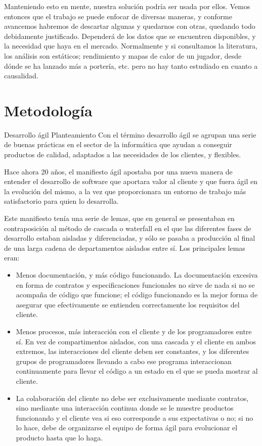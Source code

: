 Manteniendo esto en mente, nuestra solución 
podría ser usada por ellos. Vemos entonces 
que el trabajo se puede enfocar de diversas 
maneras, y conforme avancemos habremos de descartar algunas y 
quedarnos con otras, quedando todo debidamente justificado. Dependerá de los 
datos que se encuentren disponibles, y la necesidad que haya en el mercado. 
Normalmente y si consultamos la literatura, los análisis son estáticos; 
rendimiento y mapas de calor de un jugador, desde dónde se ha lanzado más 
a portería, etc. pero no hay tanto estudiado en cuanto a causalidad.

\section{Metodología}

Desarrollo ágil
Planteamiento
Con el término desarrollo ágil se agrupan una serie de buenas prácticas en 
el sector de la informática que ayudan a conseguir productos de calidad, 
adaptados a las necesidades de los clientes, y flexibles. 

Hace ahora 20 años, el manifiesto ágil apostaba por una nueva manera de 
entender el desarrollo de software que aportara valor al cliente y que fuera 
ágil en la evolución del mismo, a la vez que proporcionara un entorno de 
trabajo más satisfactorio para quien lo desarrolla.

Este manifiesto tenía una serie de lemas, que en general se presentaban en 
contraposición al método de cascada o waterfall en el que las diferentes 
fases de desarrollo estaban aisladas y diferenciadas, y sólo se pasaba a 
producción al final de una larga cadena de departamentos aislados entre sí. 
Los principales lemas eran:
\begin{itemize}
    \item Menos documentación, y más código funcionando. La documentación excesiva en 
    forma de contratos y especificaciones funcionales no sirve de nada si no se 
    acompaña de código que funcione; el código funcionando es la mejor forma de 
    asegurar que efectivamente se entienden correctamente los requisitos del 
    cliente.
    \item Menos procesos, más interacción con el cliente y de los 
    programadores entre sí. En vez de compartimentos aislados, con una 
    cascada y el cliente en ambos extremos, las interacciones del cliente 
    deben ser constantes, y los diferentes grupos de programadores llevando 
    a cabo ese programa interaccionan continuamente para llevar el código a 
    un estado en el que se pueda mostrar al cliente.
    \item La colaboración del cliente no debe ser exclusivamente mediante 
    contratos, sino mediante una interacción continua donde se le 
    muestre productos funcionando y el cliente vea si eso corresponde a sus 
    expectativas o no; si no lo hace, debe de organizarse el equipo de forma 
    ágil para evolucionar el producto hasta que lo haga.
\end{itemize}


